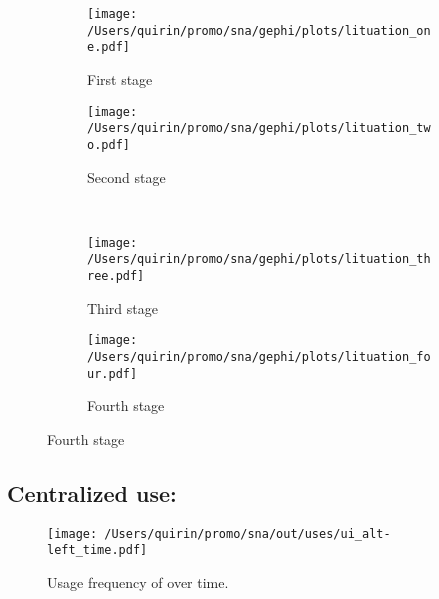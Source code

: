\documentclass[
  a4paper,
  ]{scrartcl}
\begin{document}
    \begin{figure}[H]
      \caption{Social network of diffusion for  over time.}
      \centering
      \begin{subfigure}{.45\linewidth}
        \caption{First stage}
        \centering
        \texttt{[image: /Users/quirin/promo/sna/gephi/plots/lituation\_one.pdf]}
      \end{subfigure}
      \begin{subfigure}{.45\linewidth}
        \caption{Second stage}
        \centering
        \texttt{[image: /Users/quirin/promo/sna/gephi/plots/lituation\_two.pdf]}
      \end{subfigure}\\
      \begin{subfigure}{.45\linewidth}
        \caption{Third stage}
        \centering
        \texttt{[image: /Users/quirin/promo/sna/gephi/plots/lituation\_three.pdf]}
      \end{subfigure}
      \begin{subfigure}{.45\linewidth}
        \caption{Fourth stage}
        \centering
        \texttt{[image: /Users/quirin/promo/sna/gephi/plots/lituation\_four.pdf]}
      \end{subfigure}
    \end{figure}

  \subsection{Centralized use: }

    \begin{figure}[H]
      \caption{Usage frequency of  over time.}
      \centering
      \texttt{[image: /Users/quirin/promo/sna/out/uses/ui\_alt-left\_time.pdf]}
    \end{figure}
\end{document}
